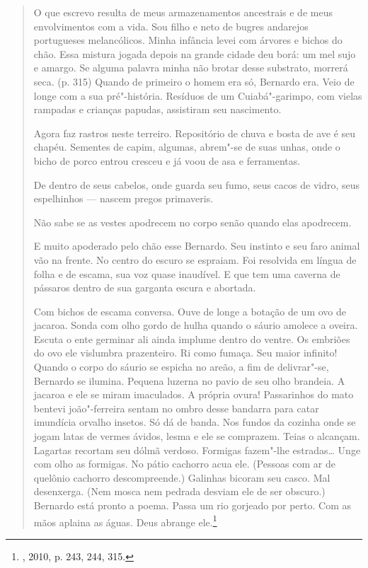\begin{quote}
O que escrevo resulta de meus armazenamentos ancestrais e de meus
envolvimentos com a vida. Sou filho e neto de bugres andarejos
portugueses melancólicos. Minha infância levei com árvores e bichos do
chão. Essa mistura jogada depois na grande cidade deu borá: um mel sujo
e amargo. Se alguma palavra minha não brotar desse substrato, morrerá
seca. (p. 315) Quando de primeiro o homem era só, Bernardo era. Veio de
longe com a sua pré"-história. Resíduos de um Cuiabá"-garimpo, com vielas
rampadas e crianças papudas, assistiram seu nascimento.

Agora faz rastros neste terreiro. Repositório de chuva e
bosta de ave é seu chapéu. Sementes de capim, algumas, abrem"-se de suas
unhas, onde o bicho de porco entrou cresceu e já voou de asa e
ferramentas.

De dentro de seus cabelos, onde guarda seu fumo, seus cacos de vidro,
seus espelhinhos --- nascem pregos primaveris.

Não sabe se as vestes apodrecem no corpo senão quando elas apodrecem.

E muito apoderado pelo chão esse Bernardo. Seu instinto e seu faro
animal vão na frente. No centro do escuro se espraiam. Foi resolvida em
língua de folha e de escama, sua voz quase inaudível. E que tem uma
caverna de pássaros dentro de sua garganta escura e abortada.

Com bichos de escama conversa. Ouve de longe a botação de um ovo de
jacaroa. Sonda com olho gordo de hulha quando o sáurio amolece a oveira.
Escuta o ente germinar ali ainda implume dentro do ventre. Os embriões
do ovo ele vislumbra prazenteiro. Ri como fumaça. Seu maior infinito!
Quando o corpo do sáurio se espicha no areão, a fim de delivrar"-se,
Bernardo se ilumina. Pequena luzerna no pavio de seu olho brandeia. A
jacaroa e ele se miram imaculados. A própria ovura! Passarinhos do mato
bentevi joão"-ferreira sentam no ombro desse bandarra para catar
imundícia orvalho insetos. Só dá de banda. Nos fundos da cozinha onde se
jogam latas de vermes ávidos, lesma e ele se comprazem. Teias o
alcançam. Lagartas recortam seu dólmã verdoso. Formigas fazem"-lhe
estradas\ldots{} Unge com olho as formigas. No pátio cachorro acua ele.
(Pessoas com ar de quelônio cachorro descompreende.) Galinhas bicoram
seu casco. Mal desenxerga. (Nem mosca nem pedrada desviam ele de ser
obscuro.) Bernardo está pronto a poema. Passa um rio gorjeado por perto.
Com as mãos aplaina as águas. Deus abrange ele.\footnote{, 2010,
  p. 243, 244, 315.}
\end{quote}

